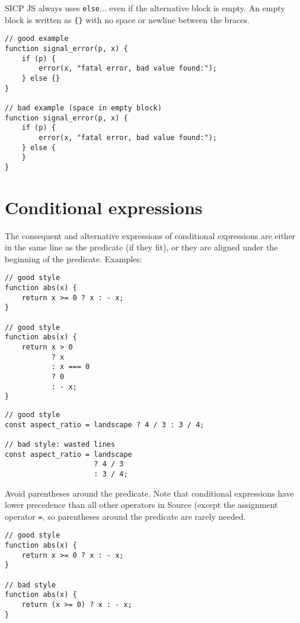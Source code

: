 SICP JS always uses \lstinline{else}... even if the alternative block
is empty. An empty block is written as \lstinline~{}~ with no space or newline
between the braces.

\begin{lstlisting}
// good example
function signal_error(p, x) {
    if (p) {
        error(x, "fatal error, bad value found:");
    } else {}
}

// bad example (space in empty block)
function signal_error(p, x) {
    if (p) {
        error(x, "fatal error, bad value found:");
    } else {
    }
}
\end{lstlisting}

\vspace{-4mm}

\section*{Conditional expressions}

The consequent and alternative expressions of conditional expressions
are either in the same line as the predicate (if they fit),
or they are aligned under the beginning of the predicate.
Examples:
\begin{lstlisting}
// good style
function abs(x) {
    return x >= 0 ? x : - x;
}

// good style
function abs(x) {
    return x > 0
           ? x
           : x === 0
           ? 0
           : - x;
}
\end{lstlisting}
\begin{lstlisting}
// good style
const aspect_ratio = landscape ? 4 / 3 : 3 / 4;

// bad style: wasted lines
const aspect_ratio = landscape
                     ? 4 / 3
                     : 3 / 4;
\end{lstlisting}

Avoid parentheses around the predicate. Note that conditional expressions have lower
precedence than all other operators in Source (except the assignment operator
\lstinline{=}, so parentheses around the predicate are rarely needed.

\begin{lstlisting}
// good style
function abs(x) {
    return x >= 0 ? x : - x;
}

// bad style
function abs(x) {
    return (x >= 0) ? x : - x;
}
\end{lstlisting}

